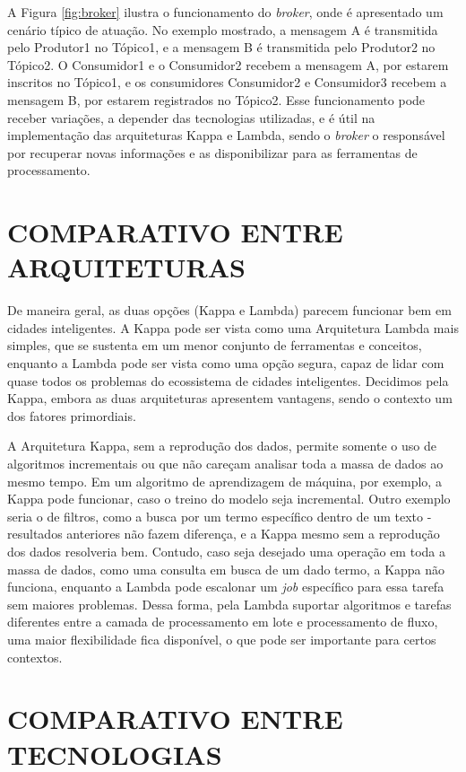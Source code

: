 A Figura \ref{fig:broker} ilustra o funcionamento do \textit{broker}, onde é
apresentado um cenário típico de atuação. No exemplo mostrado, a mensagem A
é transmitida pelo Produtor1 no Tópico1, e a mensagem B é transmitida pelo
Produtor2 no Tópico2. O Consumidor1 e o Consumidor2 recebem a mensagem A, por
estarem inscritos no Tópico1, e os consumidores Consumidor2 e Consumidor3
recebem a mensagem B, por estarem registrados no Tópico2. Esse funcionamento
pode receber variações, a depender das tecnologias utilizadas, e é útil
na implementação das arquiteturas Kappa e Lambda, sendo o
\textit{broker} o responsável por recuperar novas informações e as
disponibilizar para as ferramentas de processamento.

\section{COMPARATIVO ENTRE ARQUITETURAS}

De maneira geral, as duas opções (Kappa e Lambda) parecem funcionar bem em
cidades inteligentes. A Kappa pode ser vista como uma Arquitetura Lambda mais
simples, que se sustenta em um menor conjunto de ferramentas e
conceitos, enquanto a Lambda pode ser vista como uma opção segura,
capaz de lidar com quase todos os problemas do ecossistema de cidades
inteligentes. Decidimos pela Kappa, embora as duas arquiteturas apresentem
vantagens, sendo o contexto um dos fatores primordiais.

A Arquitetura Kappa, sem a reprodução dos dados, permite somente o uso de
algoritmos incrementais ou que não careçam analisar toda a massa de dados ao
mesmo tempo. Em um algoritmo de aprendizagem de máquina, por exemplo, a Kappa
pode funcionar, caso o treino do modelo seja incremental. Outro exemplo
seria o de filtros, como a busca por um termo específico dentro de um texto -
resultados anteriores não fazem diferença, e a Kappa mesmo sem a reprodução
dos dados resolveria bem. Contudo, caso seja desejado uma operação em toda
a massa de dados, como uma consulta em busca de um dado termo, a Kappa
não funciona, enquanto a Lambda pode escalonar um \textit{job} específico para essa
tarefa sem maiores problemas. Dessa forma, pela Lambda suportar algoritmos e tarefas
diferentes entre a camada de processamento em lote e processamento de fluxo, uma
maior flexibilidade fica disponível, o que pode ser importante para certos
contextos.

\section{COMPARATIVO ENTRE TECNOLOGIAS}

